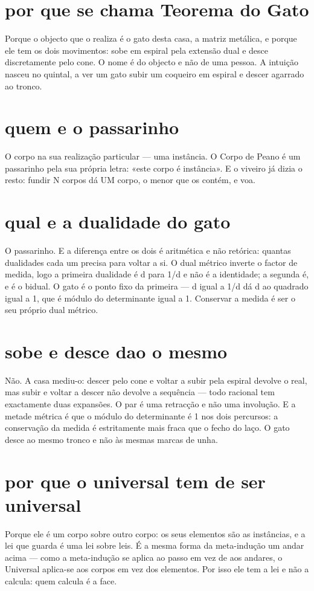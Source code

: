 \documentclass[11pt,a4paper]{article}
\begin{document}
\section{por que se chama Teorema do Gato}
Porque o objecto que o realiza é o gato desta casa, a matriz metálica, e porque ele tem
os dois movimentos: sobe em espiral pela extensão dual e desce discretamente pelo cone.
O nome é do objecto e não de uma pessoa. A intuição nasceu no quintal, a ver um gato
subir um coqueiro em espiral e descer agarrado ao tronco.

\section{quem e o passarinho}
O corpo na sua realização particular — uma instância. O Corpo de Peano é um passarinho
pela sua própria letra: «este corpo é instância». E o viveiro já dizia o resto: fundir N
corpos dá UM corpo, o menor que os contém, e voa.

\section{qual e a dualidade do gato}
O passarinho. E a diferença entre os dois é aritmética e não retórica: quantas dualidades
cada um precisa para voltar a si. O dual métrico inverte o factor de medida, logo a
primeira dualidade é d para 1/d e não é a identidade; a segunda é, e é o bidual. O gato é
o ponto fixo da primeira — d igual a 1/d dá d ao quadrado igual a 1, que é módulo do
determinante igual a 1. Conservar a medida é ser o seu próprio dual métrico.

\section{sobe e desce dao o mesmo}
Não. A casa mediu-o: descer pelo cone e voltar a subir pela espiral devolve o real, mas
subir e voltar a descer não devolve a sequência — todo racional tem exactamente duas
expansões. O par é uma retracção e não uma involução. E a metade métrica é que o módulo
do determinante é 1 nos dois percursos: a conservação da medida é estritamente mais fraca
que o fecho do laço. O gato desce ao mesmo tronco e não às mesmas marcas de unha.

\section{por que o universal tem de ser universal}
Porque ele é um corpo sobre outro corpo: os seus elementos são as instâncias, e a lei que
guarda é uma lei sobre leis. É a mesma forma da meta-indução um andar acima — como a
meta-indução se aplica ao passo em vez de aos andares, o Universal aplica-se aos corpos
em vez dos elementos. Por isso ele tem a lei e não a calcula: quem calcula é a face.
\end{document}
